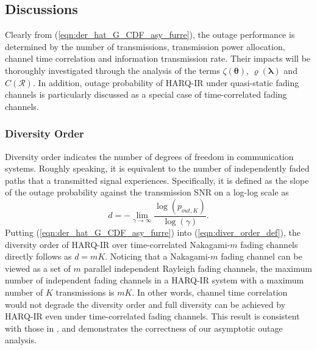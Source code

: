 \documentclass[12pt,onecolumn,draftcls]{IEEEtran}
\newcommand{\bs}{\boldsymbol}
\begin{document}
\subsection{Discussions}
Clearly from (\ref{eqn:der_hat_G_CDF_asy_furre}), the outage performance is determined by the number of transmissions, transmission power allocation, channel time correlation and information transmission rate. Their impacts will be thoroughly investigated through the analysis of the terms $\zeta(\bs \theta) $, $\varrho(\bs \lambda)$ and $C(\mathcal R)$. In addition, outage probability of HARQ-IR under quasi-static fading channels is particularly discussed as a special case of time-correlated fading channels.
\subsubsection{Diversity Order}
Diversity order indicates the number of degrees of freedom in communication systems. Roughly speaking, it is equivalent to the number of independently faded paths that a transmitted signal experiences. Specifically, it is defined as the slope of the outage probability against the transmission SNR on a log-log scale as \cite{chelli2014performance}
\begin{equation}\label{eqn:diver_order_def}
d = -\mathop {\lim }\limits_{\gamma  \to \infty } \frac{{\log \left( {{ p_{out,K}}} \right)}}{{\log \left( \gamma  \right)}}.
\end{equation}
Putting (\ref{eqn:der_hat_G_CDF_asy_furre}) into (\ref{eqn:diver_order_def}), the diversity order of HARQ-IR over time-correlated Nakagami-$m$ fading channels directly follows as $d=mK$. Noticing that a Nakagami-$m$ fading channel can be viewed as a set of $m$ parallel independent Rayleigh fading channels, the maximum number of independent fading channels in a HARQ-IR system with a maximum number of $K$ transmissions is $mK$. In other words, channel time correlation would not degrade the diversity order and full diversity can be achieved by HARQ-IR even under time-correlated fading channels. This result is consistent with those in \cite{shi2015analysis,shi2016inverse}, and demonstrates the correctness of our asymptotic outage analysis.
\end{document}
